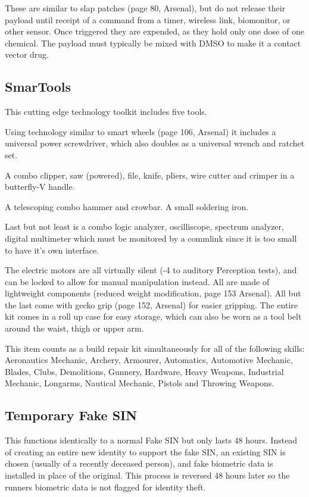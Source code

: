 \documentclass{article}
\begin{document}
  These are similar to slap patches (page 80, Arsenal), but do not release their payload until receipt of a command from a timer, wireless link, biomonitor, or other sensor.  Once triggered they are expended, as they hold only one dose of one chemical.  The payload must typically be mixed with DMSO to make it a contact vector drug.

\subsection*{SmarTools}

  This cutting edge technology toolkit includes five tools.

  Using technology similar to smart wheels (page 106, Arsenal) it includes a universal power screwdriver, which also doubles as a universal wrench and ratchet set.
  
  A combo clipper, saw (powered), file, knife, pliers, wire cutter and crimper in a butterfly-V handle.
  
  A telescoping combo hammer and crowbar.  A small soldering iron.  
  
  Last but not least is a combo logic analyzer, oscilliscope, spectrum analyzer, digital multimeter which must be monitored by a commlink since it is too small to have it's own interface.

  The electric motors are all virtually silent (-4 to auditory Perception tests), and can be locked to allow for manual manipulation instead.  All are made of lightweight components (reduced weight modification, page 153 Arsenal).  All but the last come with gecko grip (page 152, Arsenal) for easier gripping.  The entire kit comes in a roll up case for easy storage, which can also be worn as a tool belt around the waist, thigh or upper arm.

  This item counts as a build repair kit simultaneously for all of the following skills:  Aeronautics Mechanic, Archery, Armourer, Automatics, Automotive Mechanic, Blades, Clubs, Demolitions, Gunnery, Hardware, Heavy Weapons, Industrial Mechanic, Longarms, Nautical Mechanic, Pistols and Throwing Weapons.

\subsection*{Temporary Fake SIN}

This functions identically to a normal Fake SIN but only lasts 48 hours.  Instead of creating an entire new identity to support the fake SIN, an existing SIN is chosen (usually of a recently deceased person), and fake biometric data is installed in place of the original.  This process is reversed 48 hours later so the runners biometric data is not flagged for identity theft.
\end{document}
